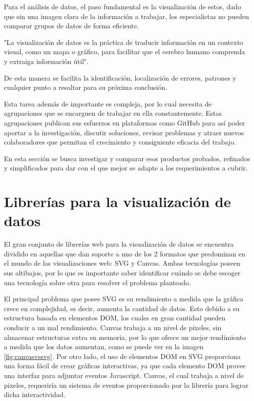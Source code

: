 Para el análisis de datos, el paso fundamental es la visualización de estos, dado que sin una imagen clara de la información a trabajar, los especialistas no pueden comparar grupos de datos de forma eficiente. 

"La visualización de datos es la práctica de traducir información en un contexto visual, como un mapa o gráfico, para facilitar que el cerebro humano comprenda y extraiga información útil". \cite{DefinitionDataViz}

De esta manera se facilita la identificación, localización de errores, patrones y cualquier punto a resaltar para su próxima conclusión.

Esta tarea además de importante es compleja, por lo cual necesita de agrupaciones que se encarguen de trabajar en ella constantemente. Estas agrupaciones publican sus esfuerzos en plataformas como GitHub para así poder aportar a la investigación, discutir soluciones, revisar problemas y atraer nuevos colaboradores que permitan el crecimiento y consiguiente eficacia del trabajo.

En esta sección se busca investigar y comparar esos productos probados, refinados y simplificados para dar con el que mejor se adapte a los requerimientos a cubrir. 




\section{Librerías para la visualización de datos}

El gran conjunto de librerías web para la visualización de datos se encuentra dividido en aquellas que dan soporte a uno de los 2 formatos que predominan en el mundo de las visualizaciones web: SVG y Canvas. Ambas tecnologías poseen sus altibajos, por lo que es importante saber identificar cuándo se debe escoger una tecnología sobre otra para resolver el problema planteado. 

El principal problema que posee SVG es su rendimiento a medida que la gráfica crece en complejidad, es decir, aumenta la cantidad de datos. Esto debido a su estructura basada en elementos DOM, los cuales en gran cantidad pueden conducir a un mal rendimiento\cite{SVGPerformance}. Canvas trabaja a un nivel de pixeles, sin almacenar estructuras extra en memoria, por lo que ofrece un mejor rendimiento a medida que los datos aumentan, como se puede ver en la imagen \ref{fig:canvasvssvg}. Por otro lado, el uso de elementos DOM en SVG proporciona una forma fácil de crear gráficas interactivas, ya que cada elemento DOM provee una interfaz para adjuntar eventos Javascript. Canvas, el cual trabaja a nivel de pixeles, requeriría un sistema de eventos proporcionado por la librería para lograr dicha interactividad.

